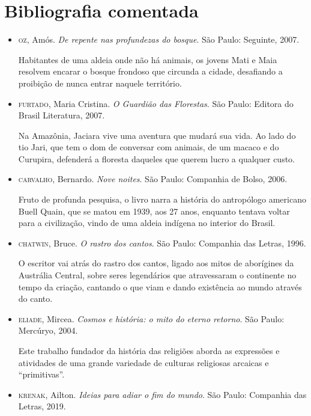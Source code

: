 \documentclass[12pt]{extarticle}
\begin{document}
\section{Bibliografia comentada}

\begin{itemize}

\item\textsc{oz}, Amós. \emph{De repente nas profundezas do bosque}. São Paulo:
Seguinte, 2007.

Habitantes de uma aldeia onde não há animais, os jovens Mati e Maia
resolvem encarar o bosque frondoso que circunda a cidade, desafiando a
proibição de nunca entrar naquele território.

\item\textsc{furtado}, Maria Cristina. \emph{O Guardião das Florestas}. São Paulo:
Editora do Brasil Literatura, 2007.

Na Amazônia, Jaciara vive uma aventura que mudará sua vida. Ao lado do
tio Jari, que tem o dom de conversar com animais, de um macaco e do
Curupira, defenderá a floresta daqueles que querem lucro a qualquer
custo.

\item\textsc{carvalho}, Bernardo. \emph{Nove noites}. São Paulo: Companhia de Bolso, 2006.

Fruto de profunda pesquisa, o livro narra a história do antropólogo
americano Buell Quain, que se matou em 1939, aos 27 anos, enquanto
tentava voltar para a civilização, vindo de uma aldeia indígena no
interior do Brasil.

\item\textsc{chatwin}, Bruce. \emph{O rastro dos cantos}. São Paulo: Companhia das
Letras, 1996.

O escritor vai atrás do rastro dos cantos, ligado aos mitos de
aborígines da Austrália Central, sobre seres legendários que
atravessaram o continente no tempo da criação, cantando o que viam e
dando existência ao mundo através do canto.


\item\textsc{eliade}, Mircea. \emph{Cosmos e história: o mito do eterno retorno}. São Paulo: Mercúryo, 2004.

Este trabalho fundador da história das religiões aborda as expressões e
atividades de uma grande variedade de culturas religiosas arcaicas e
``primitivas''.

\item\textsc{krenak}, Ailton. \emph{Ideias para adiar o fim do mundo}. São Paulo:
Companhia das Letras, 2019.


\end{itemize}
\end{document}
